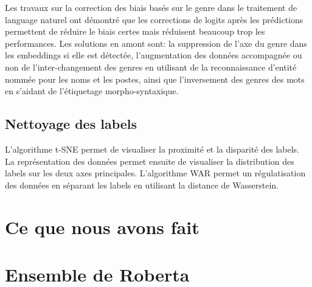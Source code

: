 Les travaux sur la correction des biais basés sur le genre dans le traitement de language naturel  ont démontré que les corrections de logits après les prédictions permettent de réduire le biais certes mais réduisent beaucoup trop les performances. Les solutions en amont sont: la suppression de l'axe du genre dans les embeddings  si elle est détectée, l'augmentation des données  accompagnée ou non de l'inter-changement des genres en utilisant de la reconnaissance d'entité nommée pour les noms et les postes, ainsi que l'inversement des genres des mots en s'aidant de l'étiquetage morpho-syntaxique.

\subsection{Nettoyage des labels}
L'algorithme t-SNE  permet de visualiser la proximité et la disparité des labels. La représentation des données permet ensuite de visualiser la distribution des labels sur les deux axes principales. L'algorithme WAR  permet un régulatisation des données en séparant les labels en utilisant la distance de Wasserstein.


\section{Ce que nous avons fait}



\section{Ensemble de Roberta}
